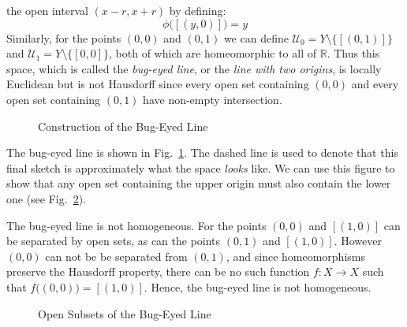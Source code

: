 \documentclass[oneside]{book}                                                  %
\begin{document}
\begin{example}
                the open interval $(x-r,x+r)$ by defining:
                \begin{equation}
                    \phi\big([(y,0)]\big)=y
                \end{equation}
                Similarly, for the points $(0,0)$ and $(0,1)$ we can define
                $\mathcal{U}_{0}=Y\setminus\{[(0,1)]\}$ and
                $\mathcal{U}_{1}=Y\setminus\{[0,0]\}$, both of which are
                homeomorphic to all of $\mathbb{R}$. Thus this space, which is
                called the \textit{bug-eyed line}, or the
                \textit{line with two origins}, is
                locally Euclidean but is not Hausdorff since every open set
                containing $(0,0)$ and every open set containing $(0,1)$ have
                non-empty intersection.
            \end{example}
            \begin{figure}[H]
                \centering
                \captionsetup{type=figure}
                
                \caption{Construction of the Bug-Eyed Line}
                \label{fig:Bug_Eyed_Line}
            \end{figure}
            The bug-eyed line is shown in
            Fig.~\ref{fig:Bug_Eyed_Line}. The dashed line is used to denote that
            this final sketch is approximately what the space \textit{looks}
            like. We can use this figure to show that any open set containing
            the upper origin must also contain the lower one
            (see Fig.~\ref{fig:Open_Neighborhoods_of_Origins_in_Bug_Eyed_Line}).
            \begin{example}
                The bug-eyed line is not homogeneous. For the points $(0,0)$ and
                $[(1,0)]$ can be separated by open sets, as can the points
                $(0,1)$ and $[(1,0)]$. However $(0,0)$ can not be be separated
                from $(0,1)$, and since homeomorphisms preserve the Hausdorff
                property, there can be no such function $f:X\rightarrow{X}$ such
                that $f\big((0,0)\big)=[(1,0)]$. Hence, the bug-eyed line is
                not homogeneous.
            \end{example}
            \begin{figure}[H]
                \centering
                \captionsetup{type=figure}
                
                \caption{Open Subsets of the Bug-Eyed Line}
                \label{fig:Open_Neighborhoods_of_Origins_in_Bug_Eyed_Line}
            \end{figure}
\end{document}
